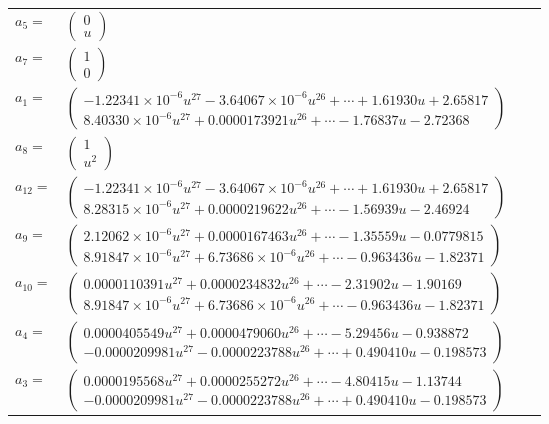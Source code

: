 \documentclass[1p]{elsarticle_modified}
\theoremstyle{definition}
\begin{document}
\begin{tabular}{m{7pt} m{180pt} m{7pt} m{180pt} }
\flushright $a_{5}=$&$\begin{pmatrix}0\\u\end{pmatrix}$ \\
\flushright $a_{7}=$&$\begin{pmatrix}1\\0\end{pmatrix}$ \\
\flushright $a_{1}=$&$\begin{pmatrix}-1.22341\times10^{-6} u^{27}-3.64067\times10^{-6} u^{26}+\cdots+1.61930 u+2.65817\\8.40330\times10^{-6} u^{27}+0.0000173921 u^{26}+\cdots-1.76837 u-2.72368\end{pmatrix}$ \\
\flushright $a_{8}=$&$\begin{pmatrix}1\\u^2\end{pmatrix}$ \\
\flushright $a_{12}=$&$\begin{pmatrix}-1.22341\times10^{-6} u^{27}-3.64067\times10^{-6} u^{26}+\cdots+1.61930 u+2.65817\\8.28315\times10^{-6} u^{27}+0.0000219622 u^{26}+\cdots-1.56939 u-2.46924\end{pmatrix}$ \\
\flushright $a_{9}=$&$\begin{pmatrix}2.12062\times10^{-6} u^{27}+0.0000167463 u^{26}+\cdots-1.35559 u-0.0779815\\8.91847\times10^{-6} u^{27}+6.73686\times10^{-6} u^{26}+\cdots-0.963436 u-1.82371\end{pmatrix}$ \\
\flushright $a_{10}=$&$\begin{pmatrix}0.0000110391 u^{27}+0.0000234832 u^{26}+\cdots-2.31902 u-1.90169\\8.91847\times10^{-6} u^{27}+6.73686\times10^{-6} u^{26}+\cdots-0.963436 u-1.82371\end{pmatrix}$ \\
\flushright $a_{4}=$&$\begin{pmatrix}0.0000405549 u^{27}+0.0000479060 u^{26}+\cdots-5.29456 u-0.938872\\-0.0000209981 u^{27}-0.0000223788 u^{26}+\cdots+0.490410 u-0.198573\end{pmatrix}$ \\
\flushright $a_{3}=$&$\begin{pmatrix}0.0000195568 u^{27}+0.0000255272 u^{26}+\cdots-4.80415 u-1.13744\\-0.0000209981 u^{27}-0.0000223788 u^{26}+\cdots+0.490410 u-0.198573\end{pmatrix}$ \\

\end{tabular}
\end{document}
